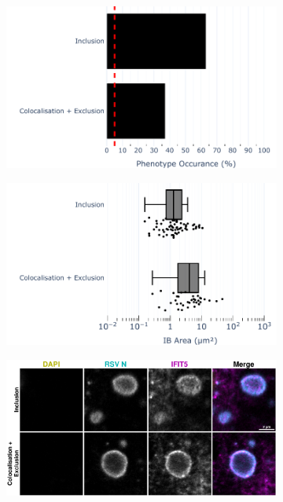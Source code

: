 \begin{figure}
    \begin{subfigure}{0.5\textwidth}
        \caption{}
        \includegraphics[width=1\linewidth]{09. Chapter 4/Figs/03. pIB/03. IFIT5/01. bar_i5_vero.pdf} 
    \end{subfigure}
    \begin{subfigure}{0.5\textwidth}
        \caption{}
        \includegraphics[width=1\linewidth]{09. Chapter 4/Figs/03. pIB/03. IFIT5/02. box_i5_vero.pdf}
    \end{subfigure}
    \begin{subfigure}{1\textwidth}
        \centering
        \caption{}
        \includegraphics[width=1\linewidth]{09. Chapter 4/Figs/03. pIB/03. IFIT5/03. i5-vero-hnhp.pdf}

\end{subfigure}
\end{figure}
